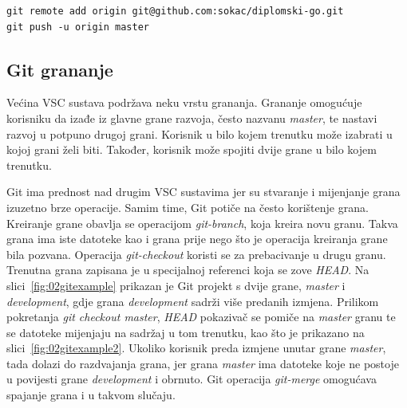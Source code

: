 \begin{lstlisting}[float=h]
git remote add origin git@github.com:sokac/diplomski-go.git
git push -u origin master
\end{lstlisting}

\subsection{Git grananje}
Većina VSC sustava podržava neku vrstu grananja. Grananje omogućuje korisniku da izađe iz glavne
grane razvoja, često nazvanu \textit{master}, te nastavi razvoj u potpuno drugoj grani. Korisnik u
bilo kojem trenutku može izabrati u kojoj grani želi biti. Također, korisnik može spojiti dvije
grane u bilo kojem trenutku.

Git ima prednost nad drugim VSC sustavima jer su stvaranje i mijenjanje grana izuzetno brze
operacije. Samim time, Git potiče na često korištenje grana. Kreiranje grane obavlja se operacijom
\textit{git-branch}, koja kreira novu granu. Takva grana ima iste datoteke kao i grana prije nego
što je operacija kreiranja grane bila pozvana. Operacija \textit{git-checkout} koristi se za
prebacivanje u drugu granu. Trenutna grana zapisana je u specijalnoj referenci koja se zove
\textit{HEAD}. Na slici~\ref{fig:02gitexample} prikazan je Git projekt s dvije grane,
\textit{master} i \textit{development}, gdje grana \textit{development} sadrži više predanih
izmjena. Prilikom pokretanja \textit{git checkout master}, \textit{HEAD} pokazivač se pomiče na
\textit{master} granu te se datoteke mijenjaju na sadržaj u tom trenutku, kao što je prikazano na
slici~\ref{fig:02gitexample2}. Ukoliko korisnik preda izmjene unutar grane \textit{master}, tada
dolazi do razdvajanja grana, jer grana \textit{master} ima datoteke koje ne postoje u povijesti
grane \textit{development} i obrnuto. Git operacija \textit{git-merge} omogućava spajanje grana i u
takvom slučaju.

